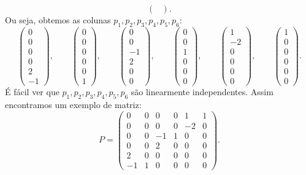 \documentclass[11pt,a4paper]{article}
\begin{document}
{\[\begin{pmatrix}
\end{pmatrix}.
\]
Ou seja, obtemos as colunas $p_1,p_2,p_3,p_4,p_5,p_6$:
\[
\begin{pmatrix}
0\\0\\0\\0\\2\\-1
\end{pmatrix},\quad\quad
\begin{pmatrix}
0\\0\\0\\0\\0\\1
\end{pmatrix},\quad\quad
\begin{pmatrix}
0\\0\\-1\\2\\0\\0
\end{pmatrix},\quad\quad
\begin{pmatrix}
0\\0\\1\\0\\0\\0
\end{pmatrix},\quad\quad
\begin{pmatrix}
1\\-2\\0\\0\\0\\0
\end{pmatrix},\quad\quad
\begin{pmatrix}
1\\0\\0\\0\\0\\0
\end{pmatrix}.
\]
É fácil ver que $p_1,p_2,p_3,p_4,p_5,p_6$ são linearmente independentes. Assim encontramos um exemplo de matriz:
\[
P=\begin{pmatrix}
0&0&0&0&1&1\\0&0&0&0&-2&0\\0&0&-1&1&0&0\\0&0&2&0&0&0\\2&0&0&0&0&0\\-1&1&0&0&0&0
\end{pmatrix}.
\]}
\end{document}
